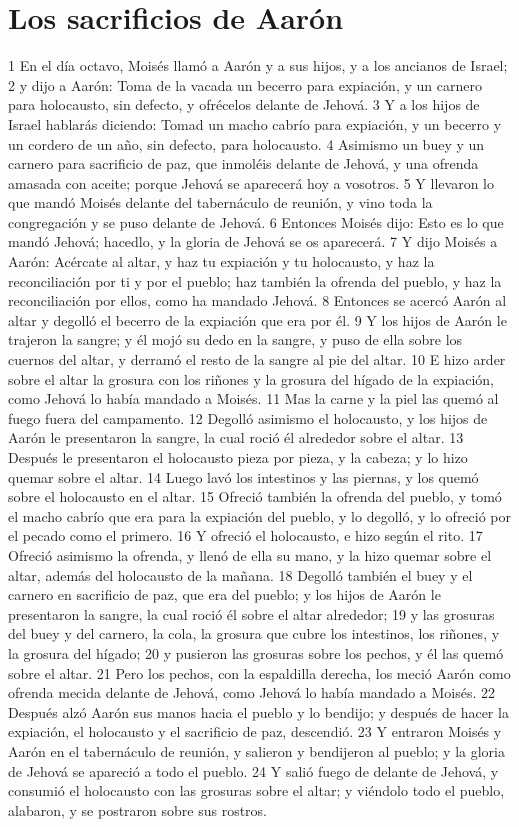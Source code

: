 \section*{Los sacrificios de Aarón}

1 En el día octavo, Moisés llamó a Aarón y a sus hijos, y a los ancianos de Israel;
2 y dijo a Aarón: Toma de la vacada un becerro para expiación, y un carnero para holocausto, sin defecto, y ofrécelos delante de Jehová.
3 Y a los hijos de Israel hablarás diciendo: Tomad un macho cabrío para expiación, y un becerro y un cordero de un año, sin defecto, para holocausto.
4 Asimismo un buey y un carnero para sacrificio de paz, que inmoléis delante de Jehová, y una ofrenda amasada con aceite; porque Jehová se aparecerá hoy a vosotros.
5 Y llevaron lo que mandó Moisés delante del tabernáculo de reunión, y vino toda la congregación y se puso delante de Jehová.
6 Entonces Moisés dijo: Esto es lo que mandó Jehová; hacedlo, y la gloria de Jehová se os aparecerá.
7 Y dijo Moisés a Aarón: Acércate al altar, y haz tu expiación y tu holocausto, y haz la reconciliación por ti y por el pueblo; haz también la ofrenda del pueblo, y haz la reconciliación por ellos, como ha mandado Jehová.
8 Entonces se acercó Aarón al altar y degolló el becerro de la expiación que era por él.
9 Y los hijos de Aarón le trajeron la sangre; y él mojó su dedo en la sangre, y puso de ella sobre los cuernos del altar, y derramó el resto de la sangre al pie del altar.
10 E hizo arder sobre el altar la grosura con los riñones y la grosura del hígado de la expiación, como Jehová lo había mandado a Moisés.
11 Mas la carne y la piel las quemó al fuego fuera del campamento.
12 Degolló asimismo el holocausto, y los hijos de Aarón le presentaron la sangre, la cual roció él alrededor sobre el altar.
13 Después le presentaron el holocausto pieza por pieza, y la cabeza; y lo hizo quemar sobre el altar.
14 Luego lavó los intestinos y las piernas, y los quemó sobre el holocausto en el altar.
15 Ofreció también la ofrenda del pueblo, y tomó el macho cabrío que era para la expiación del pueblo, y lo degolló, y lo ofreció por el pecado como el primero.
16 Y ofreció el holocausto, e hizo según el rito.
17 Ofreció asimismo la ofrenda, y llenó de ella su mano, y la hizo quemar sobre el altar, además del holocausto de la mañana.
18 Degolló también el buey y el carnero en sacrificio de paz, que era del pueblo; y los hijos de Aarón le presentaron la sangre, la cual roció él sobre el altar alrededor;
19 y las grosuras del buey y del carnero, la cola, la grosura que cubre los intestinos, los riñones, y la grosura del hígado;
20 y pusieron las grosuras sobre los pechos, y él las quemó sobre el altar.
21 Pero los pechos, con la espaldilla derecha, los meció Aarón como ofrenda mecida delante de Jehová, como Jehová lo había mandado a Moisés.
22 Después alzó Aarón sus manos hacia el pueblo y lo bendijo; y después de hacer la expiación, el holocausto y el sacrificio de paz, descendió.
23 Y entraron Moisés y Aarón en el tabernáculo de reunión, y salieron y bendijeron al pueblo; y la gloria de Jehová se apareció a todo el pueblo.
24 Y salió fuego de delante de Jehová, y consumió el holocausto con las grosuras sobre el altar; y viéndolo todo el pueblo, alabaron, y se postraron sobre sus rostros.


